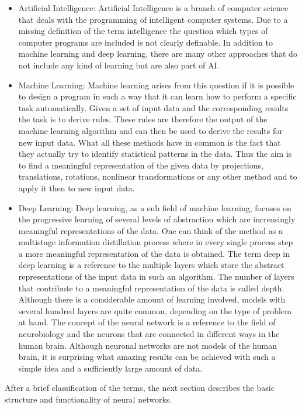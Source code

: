 \begin{itemize}
	\item Artificial Intelligence: Artificial Intelligence is a branch of computer science that deals with the programming of intelligent computer systems. Due to a missing definition of the term intelligence the question which types of computer programs are included is not clearly definable. In addition to machine learning and deep learning, there are many other approaches that do not include any kind of learning but are also part of AI. 
	\item Machine Learning: Machine learning arises from this question if it is possible to design a program in such a way that it can learn how to perform a specific task automatically. Given a set of input data and the corresponding results the task is to derive rules. These rules are therefore the output of the machine learning algorithm and can then be used to derive the results for new input data. What all these methods have in common is the fact that they actually try to identify statistical patterns in the data. Thus the aim is to find a meaningful representation of the given data by projections, translations, rotations, nonlinear transformations or any other method and to apply it then to new input data. 	 
	\item Deep Learning: Deep learning, as a sub field of machine learning, focuses on the progressive learning of several levels of abstraction which are increasingly meaningful representations of the data. One can think of the method as a multistage information distillation process where in every single process step a more meaningful representation of the data is obtained. The term deep in deep learning is a reference to the multiple layers which store the abstract representations of the input data in such an algorithm. The number of layers that contribute to a meaningful representation of the data is called depth. Although there is a considerable amount of learning involved, models with several hundred layers are quite common, depending on the type of problem at hand. The concept of the neural network is a reference to the field of neurobiology and the neurons that are connected in different ways in the human brain. Although neuronal networks are not models of the human brain, it is surprising what amazing results can be achieved with such a simple idea and a sufficiently large amount of data.
\end{itemize}
After a brief classification of the terms, the next section describes the basic structure and functionality of neural networks.

